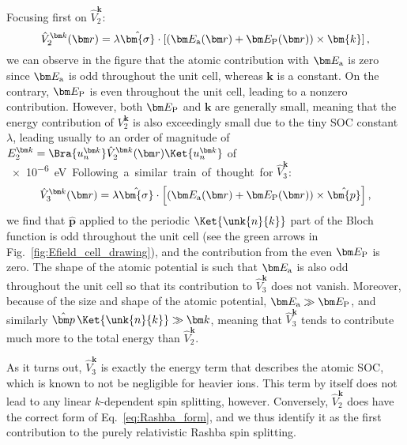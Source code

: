 Focusing first on $\hat{V}^{\bm k}_2$:
\begin{equation}
	\label{eq:Rashba_purerel}
	\hat{V}^{\bm k}_2(\bm r) = \lambda \hat{\bm{\sigma}} \cdot \left[ (\bm E_{\rm a}(\bm r) + \bm E_{\rm P}(\bm r)) \times \bm{k}\right],
\end{equation}
we can observe in the figure that the atomic contribution with $\bm E_{\rm a}$ is zero since $\bm E_{\rm a}$ is odd throughout the unit cell, whereas $\bm k$ is a constant.
On the contrary, $\bm E_{\rm P}$ is even throughout the unit cell, leading to a nonzero contribution.
However, both $\bm E_{\rm P}$ and $\bm k$ are generally small, meaning that the energy contribution of $V^{\bm k}_2$ is also exceedingly small due to the tiny \gls{SOC} constant $\lambda$, leading usually to an order of magnitude of $E^{\bm k}_2 = \Bra{u_n^{\bm k}} \hat{V}_2^{\bm k}(\bm r) \Ket{u_n^{\bm k}}$ of \SI{e-6}eV.
    
Following a similar train of thought for $\hat{V}^{\bm k}_3$:
\begin{equation}
	\label{eq:Rashba_SOC}
	\hat{V}^{\bm k}_3(\bm r) = \lambda \hat{\bm{\sigma}} \cdot \left[ (\bm E_{\rm a}(\bm r) + \bm E_{\rm P}(\bm r)) \times \hat{\bm{p}}\right],
\end{equation}
we find that $\hat{\bm p}$ applied to the periodic $\Ket{\unk{n}{k}}$ part of the Bloch function is odd throughout the unit cell (see the green arrows in Fig.~\ref{fig:Efield_cell_drawing}), and the contribution from the even $\bm E_{\rm P}$ is zero.
The shape of the atomic potential is such that $\bm E_{\rm a}$ is also odd throughout the unit cell so that its contribution to $\hat{V}^{\bm k}_3$ does not vanish.
Moreover, because of the size and shape of the atomic potential, $\bm E_{\rm a} \gg \bm E_{\rm P}$, and similarly $\hat{\bm p}\,\Ket{\unk{n}{k}} \gg \bm k$, meaning that $\hat{V}^{\bm k}_3$ tends to contribute much more to the total energy than $\hat{V}^{\bm k}_2$.

As it turns out, $\hat{V}^{\bm k}_3$ is exactly the energy term that describes the atomic \gls{SOC}, which is known to not be negligible for heavier ions.
This term by itself does not lead to any linear $k$-dependent spin splitting, however.
Conversely, $\hat{V}_2^{\bm k}$ does have the correct form of Eq.~\eqref{eq:Rashba_form}, and we thus identify it as the first contribution to the purely relativistic Rashba spin splitting.
    
